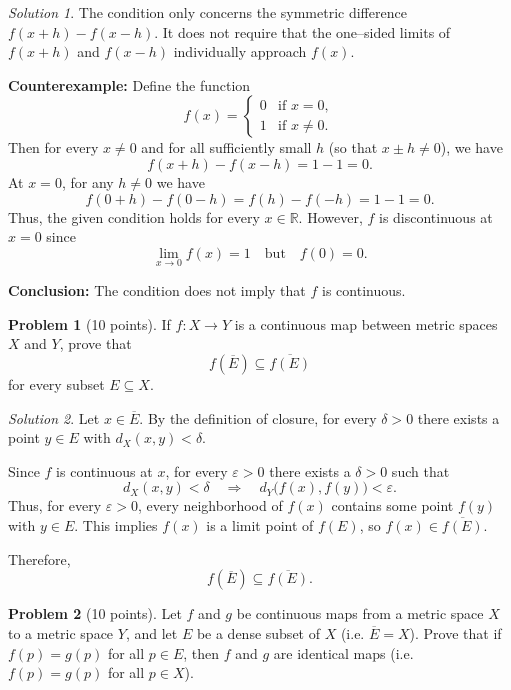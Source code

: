 \documentclass[12pt,oneside]{article}
\theoremstyle{definition}
\newtheorem{problem}{Problem}
\theoremstyle{remark}
\newtheorem*{solution}{Solution}
\begin{document}
\begin{solution}
The condition only concerns the symmetric difference \(f(x+h)-f(x-h)\). It does not require that the one--sided limits of \(f(x+h)\) and \(f(x-h)\) individually approach \(f(x)\).

\medskip
\textbf{Counterexample:} Define the function
\[
f(x) = \begin{cases}
0 & \text{if } x=0,\\[1mm]
1 & \text{if } x\neq 0.
\end{cases}
\]
Then for every \(x\neq 0\) and for all sufficiently small \(h\) (so that \(x\pm h\neq 0\)), we have
\[
f(x+h)-f(x-h)=1-1=0.
\]
At \(x=0\), for any \(h\neq0\) we have
\[
f(0+h)-f(0-h)=f(h)-f(-h)=1-1=0.
\]
Thus, the given condition holds for every \(x\in \mathbb{R}\). However, \(f\) is discontinuous at \(x=0\) since 
\[
\lim_{x\to 0}f(x)=1 \quad \text{but} \quad f(0)=0.
\]

\medskip
\textbf{Conclusion:} The condition does not imply that \(f\) is continuous.
\end{solution}

\begin{problem}[10 points]
If \(f:X \rightarrow Y\) is a continuous map between metric spaces \(X\) and \(Y\), prove that
\[
f(\overline{E}) \subseteq \overline{f(E)}
\]
for every subset \(E\subseteq X\). 
\end{problem}

\begin{solution}
Let \(x\in \overline{E}\). By the definition of closure, for every \(\delta>0\) there exists a point \(y\in E\) with \(d_X(x,y)<\delta\).

Since \(f\) is continuous at \(x\), for every \(\varepsilon>0\) there exists a \(\delta>0\) such that
\[
d_X(x,y)<\delta \quad \Longrightarrow \quad d_Y\bigl(f(x),f(y)\bigr)<\varepsilon.
\]
Thus, for every \(\varepsilon>0\), every neighborhood of \(f(x)\) contains some point \(f(y)\) with \(y\in E\). This implies \(f(x)\) is a limit point of \(f(E)\), so \(f(x)\in \overline{f(E)}\).

Therefore,
\[
f(\overline{E}) \subseteq \overline{f(E)}.
\]
\end{solution}

\begin{problem}[10 points]
Let \(f\) and \(g\) be continuous maps from a metric space \(X\) to a metric space \(Y\), and let \(E\) be a dense subset of \(X\) (i.e. \(\overline{E} = X\)). 
Prove that if \(f(p) = g(p)\) for all \(p\in E\), then \(f\) and \(g\) are identical maps (i.e. \(f(p) = g(p)\) for all \(p\in X\)). 
\end{problem}
\end{document}

